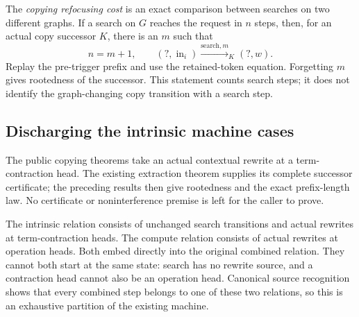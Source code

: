 

The \emph{copying refocusing cost} is an exact comparison between searches on
two different graphs. If a search on $G$ reaches the request in $n$ steps,
then, for an actual copy successor $K$, there is an $m$ such that
\[
 n=m+1,\qquad (?,\operatorname{in}_i)
       \xrightarrow{\mathrm{search},m}_{K}(?,w).
\]
Replay the pre-trigger prefix and use the retained-token equation. Forgetting
$m$ gives rootedness of the successor. This statement counts search steps;
it does not identify the graph-changing copy transition with a search step.



\subsection{Discharging the intrinsic machine cases}

The public copying theorems take an actual contextual rewrite at a
term-contraction head. The existing extraction theorem supplies its complete
successor certificate; the preceding results then give rootedness and the
exact prefix-length law. No certificate or noninterference premise is left
for the caller to prove.



The intrinsic relation consists of unchanged search transitions and actual
rewrites at term-contraction heads. The compute relation consists of actual
rewrites at operation heads. Both embed directly into the original combined
relation. They cannot both start at the same state: search has no rewrite
source, and a contraction head cannot also be an operation head. Canonical
source recognition shows that every combined step belongs to one of these
two relations, so this is an exhaustive partition of the existing machine.


